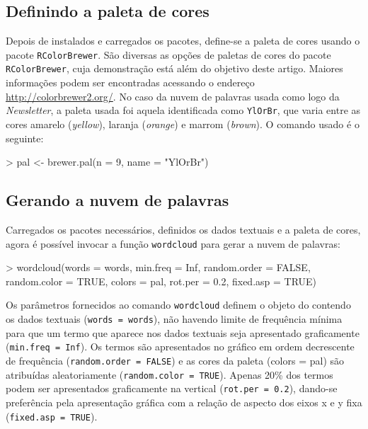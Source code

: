\subsection{Definindo a paleta de cores}
Depois de instalados e carregados os pacotes, define-se a paleta de cores usando o pacote \texttt{RColorBrewer}. São diversas as opções de paletas de cores do pacote \texttt{RColorBrewer}, cuja demonstração está além do objetivo deste artigo. Maiores informações podem ser encontradas acessando o endereço \url{http://colorbrewer2.org/}. No caso da nuvem de palavras usada como logo da \textit{Newsletter}, a paleta usada foi aquela identificada como \texttt{YlOrBr}, que varia entre as cores amarelo (\emph{yellow}), laranja (\emph{orange}) e marrom (\emph{brown}). O comando usado é o seguinte:
\begin{smallverbatim}
> pal <- brewer.pal(n = 9, name = "YlOrBr")
\end{smallverbatim}
\subsection{Gerando a nuvem de palavras}
Carregados os pacotes necessários, definidos os dados textuais e a paleta de cores, agora é possível invocar a função \texttt{wordcloud} para gerar a nuvem de palavras:
\begin{smallverbatim}
> wordcloud(words = words, min.freq = Inf,
random.order = FALSE, random.color = TRUE,
colors = pal, rot.per = 0.2, fixed.asp = TRUE)
\end{smallverbatim}
Os parâmetros fornecidos ao comando \texttt{wordcloud} definem o objeto do \R{} contendo os dados textuais (\texttt{words = words}), não havendo limite de frequência mínima para que um termo que aparece nos dados textuais seja apresentado graficamente (\texttt{min.freq = Inf}). Os termos são apresentados no gráfico em ordem decrescente de frequência (\texttt{random.order = FALSE}) e as cores da paleta (colors = pal) são atribuídas aleatoriamente (\texttt{random.color = TRUE}). Apenas 20\% dos termos podem ser apresentados graficamente na vertical (\texttt{rot.per = 0.2}), dando-se preferência pela apresentação gráfica com a relação de aspecto dos eixos x e y fixa (\texttt{fixed.asp = TRUE}).
